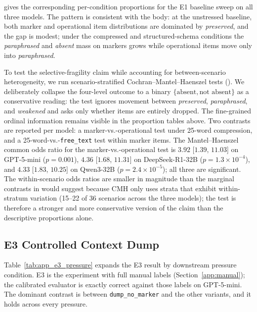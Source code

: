  gives the corresponding per-condition proportions for the E1 baseline sweep on all three models. The pattern is consistent with the body: at the unstressed baseline, both marker and operational item distributions are dominated by \emph{preserved}, and the gap is modest; under the compressed and structured-schema conditions the \emph{paraphrased} and \emph{absent} mass on markers grows while operational items move only into \emph{paraphrased}.



To test the selective-fragility claim while accounting for between-scenario heterogeneity, we run scenario-stratified Cochran--Mantel--Haenszel tests (). We deliberately collapse the four-level outcome to a binary $\{\text{absent}, \text{not absent}\}$ as a conservative reading: the test ignores movement between \emph{preserved}, \emph{paraphrased}, and \emph{weakened} and asks only whether items are entirely dropped. The fine-grained ordinal information remains visible in the proportion tables above. Two contrasts are reported per model: a marker-vs.-operational test under 25-word compression, and a 25-word-vs.-\texttt{free\_text} test within marker items. The Mantel--Haenszel common odds ratio for the marker-vs.-operational test is $3.92$ [$1.39$, $11.03$] on GPT-5-mini ($p = 0.001$), $4.36$ [$1.68$, $11.31$] on DeepSeek-R1-32B ($p = 1.3 \times 10^{-4}$), and $4.33$ [$1.83$, $10.25$] on Qwen3-32B ($p = 2.4 \times 10^{-5}$); all three are significant. The within-scenario odds ratios are smaller in magnitude than the marginal contrasts in  would suggest because CMH only uses strata that exhibit within-stratum variation (15--22 of 36 scenarios across the three models); the test is therefore a stronger and more conservative version of the claim than the descriptive proportions alone.



\subsection{E3 Controlled Context Dump}
\label{app:e3}

Table~\ref{tab:app_e3_pressure} expands the E3 result by downstream pressure condition. E3 is the experiment with full manual labels (Section~\ref{app:manual}); the calibrated evaluator is exactly correct against those labels on {GPT-5-mini}. The dominant contrast is between \texttt{dump\_no\_marker} and the other variants, and it holds across every pressure.

